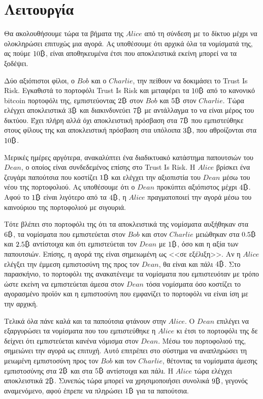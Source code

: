 \section{Λειτουργία}
  Θα ακολουθήσουμε τώρα τα βήματα της $Alice$ από τη σύνδεση με το δίκτυο μέχρι να ολοκληρώσει επιτυχώς μια αγορά. Ας
  υποθέσουμε ότι αρχικά όλα τα νομίσματά της, ας πούμε $10\bitcoin$, είναι αποθηκευμένα έτσι που αποκλειστικά εκείνη μπορεί να
  τα ξοδέψει.

  Δύο αξιόπιστοι φίλοι, ο $Bob$ και ο $Charlie$, την πείθουν να δοκιμάσει το \textlatin{Trust Is Risk}. Εγκαθιστά το πορτοφόλι
  \textlatin{Trust Is Risk} και μεταφέρει τα $10\bitcoin$ από το κανονικό \textlatin{bitcoin} πορτοφόλι της, εμπιστεύοντας
  $2\bitcoin$ στον $Bob$ και $5\bitcoin$ στον $Charlie$. Τώρα ελέγχει αποκλειστικά $3\bitcoin$ και διακινδυνεύει $7\bitcoin$
  με αντάλλαγμα το να είναι μέρος του δικτύου. Έχει πλήρη αλλά όχι αποκλειστική πρόσβαση στα $7\bitcoin$ που εμπιστεύθηκε
  στους φίλους της και αποκλειστική πρόσβαση στα υπόλοιπα $3\bitcoin$, που αθροίζονται στα $10\bitcoin$.

  Μερικές ημέρες αργότερα, ανακαλύπτει ένα διαδικτυακό κατάστημα παπουτσιών του $Dean$, ο οποίος είναι συνδεδεμένος επίσης στο
  \textlatin{Trust Is Risk}. Η $Alice$ βρίσκει ένα ζευγάρι παπούτσια που κοστίζει $1\bitcoin$ και ελέγχει την αξιοπιστία του
  $Dean$ μέσω του νέου της πορτοφολιού. Ας υποθέσουμε ότι ο $Dean$ προκύπτει αξιόπιστος μέχρι $4\bitcoin$. Αφού το $1\bitcoin$
  είναι λιγότερο από τα $4\bitcoin$, η $Alice$ πραγματοποιεί την αγορά μέσω του καινούριου της πορτοφολιού με σιγουριά.

  Τότε βλέπει στο πορτοφόλι της ότι τα αποκλειστικά της νομίσματα αυξήθηκαν στα $6\bitcoin$, τα νομίσματα που εμπιστεύεται
  στον $Bob$ και στον $Charlie$ μειώθηκαν στα $0.5\bitcoin$ και $2.5\bitcoin$ αντίστοιχα και ότι εμπιστεύεται τον $Dean$ με
  $1\bitcoin$, όσο και η αξία των παπουτσιών. Επίσης, η αγορά της είναι σημειωμένη ως <<σε εξέλιξη>>. Αν η $Alice$ ελέγξει την
  έμμεση εμπιστοσύνη της προς τον $Dean$, θα είναι και πάλι $4\bitcoin$. Στο παρασκήνιο, το πορτοφόλι της ανακατένειμε τα
  νομίσματα που εμπιστευόταν με τρόπο ώστε εκείνη να εμπιστεύεται άμεσα στον $Dean$ τόσα νομίσματα όσο κοστίζει το αγορασμένο
  προϊόν και η εμπιστοσύνη που εμφανίζει το πορτοφόλι να είναι ίση με την αρχική.

  Τελικά όλα πάνε καλά και τα παπούτσια φτάνουν στην $Alice$. Ο $Dean$ επιλέγει να εξαργυρώσει τα νομίσματα που του
  εμπιστεύθηκε η $Alice$ κι έτσι το πορτοφόλι της δε δείχνει ότι εμπιστεύεται κανένα νόμισμα στον $Dean$. Μέσω του πορτοφολιού
  της, σημειώνει την αγορά ως επιτυχή. Αυτό επιτρέπει στο σύστημα να αναπληρώσει τη μειωμένη εμπιστοσύνη προς τον $Bob$ και
  τον $Charlie$, θέτοντας τα νομίσματα άμεσης εμπιστοσύνης στα $2\bitcoin$ και στα $5\bitcoin$ αντίστοιχα και πάλι. Η $Alice$
  τώρα ελέγχει αποκλειστικά $2\bitcoin$. Συνεπώς τώρα μπορεί να χρησιμοποιήσει συνολικά $9\bitcoin$, γεγονός αναμενόμενο, αφού
  έπρεπε να πληρώσει $1\bitcoin$ για τα παπούτσια.
